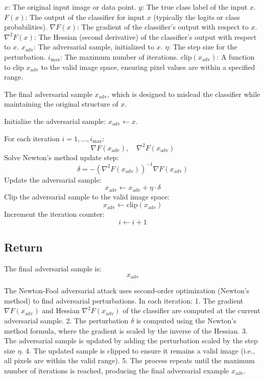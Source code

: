 $x$: The original input image or data point.
$y$: The true class label of the input $x$.
$F(x)$: The output of the classifier for input $x$ (typically the logits or class probabilities).
$\nabla F(x)$: The gradient of the classifier's output with respect to $x$.
$\nabla^2 F(x)$: The Hessian (second derivative) of the classifier's output with respect to $x$.
$x_{\text{adv}}$: The adversarial sample, initialized to $x$.
$\eta$: The step size for the perturbation.
$i_{\text{max}}$: The maximum number of iterations.
$\text{clip}(x_{\text{adv}})$: A function to clip $x_{\text{adv}}$ to the valid image space, ensuring pixel values are within a specified range.

The final adversarial sample $x_{\text{adv}}$, which is designed to mislead the classifier while maintaining the original structure of $x$.

Initialize the adversarial sample: 
\( x_{\text{adv}} \leftarrow x \).

For each iteration \( i = 1, \ldots, i_{\text{max}} \):
\[
\nabla F(x_{\text{adv}}), \quad \nabla^2 F(x_{\text{adv}})
\]
Solve Newton's method update step:
\[
\delta = - (\nabla^2 F(x_{\text{adv}}))^{-1} \nabla F(x_{\text{adv}})
\]
Update the adversarial sample:
\[
x_{\text{adv}} \leftarrow x_{\text{adv}} + \eta \cdot \delta
\]
Clip the adversarial sample to the valid image space:
\[
x_{\text{adv}} \leftarrow \text{clip}(x_{\text{adv}})
\]
Increment the iteration counter:
\[
i \leftarrow i + 1
\]

\subsection*{Return}
The final adversarial sample is:
\[
x_{\text{adv}}
\]

The Newton-Fool adversarial attack uses second-order optimization (Newton’s method) to find adversarial perturbations. In each iteration:
1. The gradient \( \nabla F(x_{\text{adv}}) \) and Hessian \( \nabla^2 F(x_{\text{adv}}) \) of the classifier are computed at the current adversarial sample.
2. The perturbation \( \delta \) is computed using the Newton’s method formula, where the gradient is scaled by the inverse of the Hessian.
3. The adversarial sample is updated by adding the perturbation scaled by the step size \( \eta \).
4. The updated sample is clipped to ensure it remains a valid image (i.e., all pixels are within the valid range).
5. The process repeats until the maximum number of iterations is reached, producing the final adversarial example \( x_{\text{adv}} \).